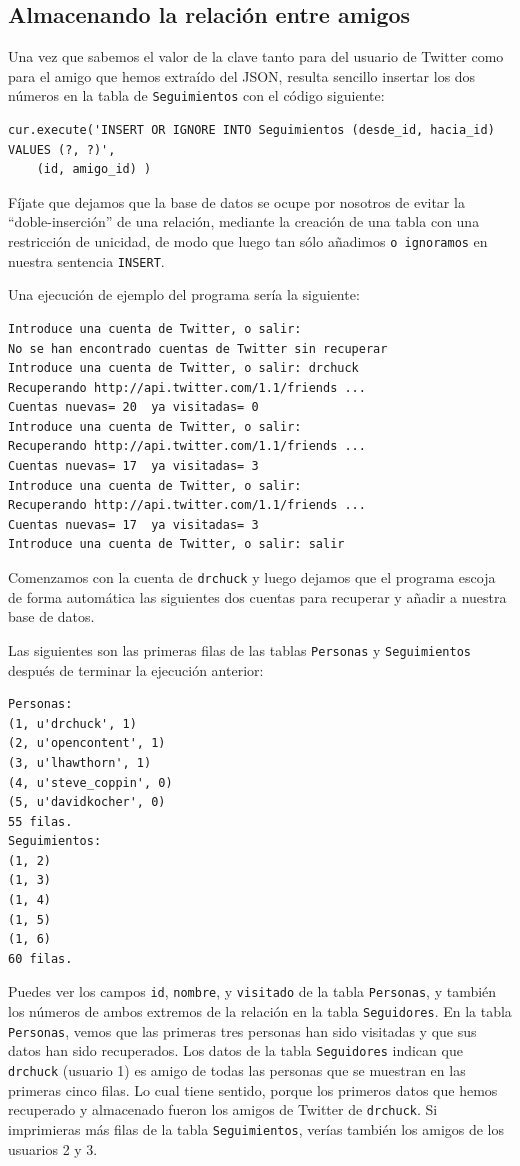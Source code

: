 \subsection{Almacenando la relación entre amigos}

Una vez que sabemos el valor de la clave tanto para del usuario de Twitter
como para el amigo que hemos extraído del JSON, resulta sencillo insertar
los dos números en la tabla de {\tt Seguimientos}
con el código siguiente:

\beforeverb
\begin{verbatim}
cur.execute('INSERT OR IGNORE INTO Seguimientos (desde_id, hacia_id) VALUES (?, ?)',
    (id, amigo_id) )
\end{verbatim}
\afterverb
%
Fíjate que dejamos que la base de datos se ocupe por nosotros de evitar la ``doble-inserción''
de una relación, mediante la creación de una tabla con una restricción de unicidad, de modo que
luego tan sólo añadimos {\tt o ignoramos} en nuestra sentencia {\tt INSERT}.

Una ejecución de ejemplo del programa sería la siguiente:

\beforeverb
\begin{verbatim}
Introduce una cuenta de Twitter, o salir:
No se han encontrado cuentas de Twitter sin recuperar
Introduce una cuenta de Twitter, o salir: drchuck
Recuperando http://api.twitter.com/1.1/friends ...
Cuentas nuevas= 20  ya visitadas= 0
Introduce una cuenta de Twitter, o salir: 
Recuperando http://api.twitter.com/1.1/friends ...
Cuentas nuevas= 17  ya visitadas= 3
Introduce una cuenta de Twitter, o salir:
Recuperando http://api.twitter.com/1.1/friends ...
Cuentas nuevas= 17  ya visitadas= 3
Introduce una cuenta de Twitter, o salir: salir
\end{verbatim}
\afterverb
%
Comenzamos con la cuenta de {\tt drchuck} y luego dejamos que el programa
escoja de forma automática las siguientes dos cuentas para recuperar y añadir
a nuestra base de datos.

Las siguientes son las primeras filas de las tablas {\tt Personas}
y {\tt Seguimientos} después de terminar la ejecución anterior:

\beforeverb
\begin{verbatim}
Personas:
(1, u'drchuck', 1)
(2, u'opencontent', 1)
(3, u'lhawthorn', 1)
(4, u'steve_coppin', 0)
(5, u'davidkocher', 0)
55 filas.
Seguimientos:
(1, 2)
(1, 3)
(1, 4)
(1, 5)
(1, 6)
60 filas.
\end{verbatim}
\afterverb
%
Puedes ver los campos {\tt id}, {\tt nombre}, y {\tt visitado} de la
tabla {\tt Personas}, y también los números de ambos extremos
de la relación en la tabla {\tt Seguidores}.
En la tabla {\tt Personas}, vemos que las primeras tres personas
han sido visitadas y que sus datos han sido recuperados.
Los datos de la tabla {\tt Seguidores} indican que
{\tt drchuck} (usuario 1) es amigo de todas las personas que se muestran en las primeras
cinco filas. Lo cual tiene sentido, porque
los primeros datos que hemos recuperado y almacenado fueron los amigos de Twitter de
{\tt drchuck}. Si imprimieras más filas de la tabla {\tt Seguimientos},
verías también los amigos de los usuarios 2 y 3.

